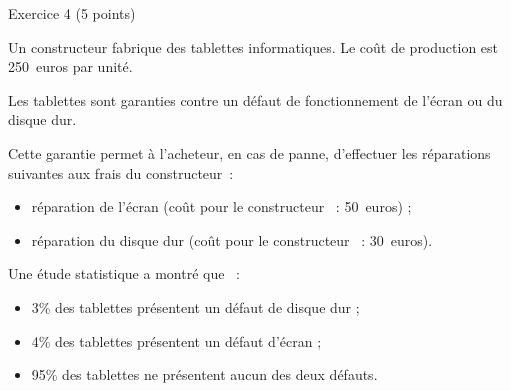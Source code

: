 
%
\begin{h2}Exercice 4 (5 points)\end{h2}
\par
Un constructeur fabrique des tablettes informatiques. Le coût de production est 250~euros par unité.
\par
Les tablettes sont garanties contre un défaut de fonctionnement de l'écran ou du disque dur.
\par
Cette garantie permet à l'acheteur, en cas de panne, d'effectuer les réparations suivantes aux frais du constructeur~:
\begin{itemize}
     \item réparation de l'écran (coût pour le constructeur ~: 50~euros) ;
     \item réparation du disque dur (coût pour le constructeur ~: 30~euros).
\end{itemize}
\par
Une étude statistique a montré que ~:
\begin{itemize}
     \item 3\% des tablettes présentent un défaut de disque dur ;
     \item 4\% des tablettes présentent un défaut d'écran ;
     \item 95\% des tablettes ne présentent aucun des deux défauts.
\end{itemize}
\par
%
%
%
%
\par
